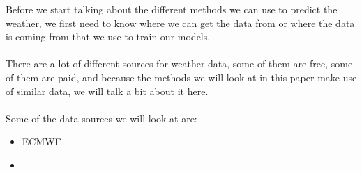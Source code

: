 \documentclass[../paper.tex]{subfiles}
\begin{document}
    Before we start talking about the different methods we can use to predict the weather, we first need to know where we can get the data from or where the data is coming from that we use to train our models.
    \\\\
    There are a lot of different sources for weather data, some of them are free, some of them are paid, and because the methods we will look at in this paper make use of similar data, we will talk a bit about it here.
    \\\\
    Some of the data sources we will look at are:
    \begin{itemize}
        \item ECMWF
        \item
    \end{itemize}
\end{document}
